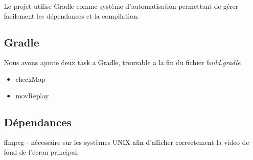 \documentclass[../main.tex]{subfiles}
\begin{document}
Le projet utilise Gradle comme système d'automatisation permettant de gérer facilement les dépendances et la compilation.
\subsection{Gradle}
Nous avons ajoute deux task a Gradle, trouvable a la fin du fichier \textit{build.gradle}
\begin{itemize}
    \item checkMap
    \item movReplay
\end{itemize}
\subsection{Dépendances}
ffmpeg - nécessaire sur les systèmes UNIX afin d'afficher correctement la video de fond de l'écran principal.
\end{document}
